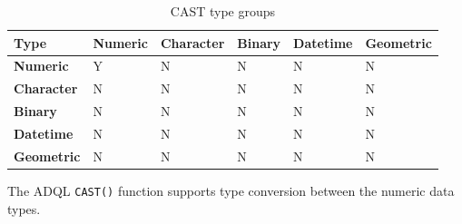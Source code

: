 \documentclass[11pt,a4paper]{ivoa}
\begin{document}
\begin{table}[thm]\footnotesize
    \begin{tabular}{
        |p{}
        |p{}
        |p{}
        |p{}
        |p{}
        |p{}
        |}

        \hline
        \textbf{Type} &
        \textbf{Numeric} &
        \textbf{Character} &
        \textbf{Binary} &
        \textbf{Datetime} &
        \textbf{Geometric}
        \tabularnewline

        \hline
        \textbf{Numeric} &
        Y &
        N &
        N &
        N &
        N
        \tabularnewline

        \hline
        \textbf{Character} &
        N &
        N &
        N &
        N &
        N
        \tabularnewline

        \hline
        \textbf{Binary} &
        N &
        N &
        N &
        N &
        N
        \tabularnewline

        \hline
        \textbf{Datetime} &
        N &
        N &
        N &
        N &
        N
        \tabularnewline

        \hline
        \textbf{Geometric} &
        N &
        N &
        N &
        N &
        N
        \tabularnewline

        \hline
    \end{tabular}
    \caption{CAST type groups}
    \label{table:adql.cast.type.group}
\end{table}


The ADQL \verb:CAST(): function supports type conversion between the numeric
data types.
\end{document}
